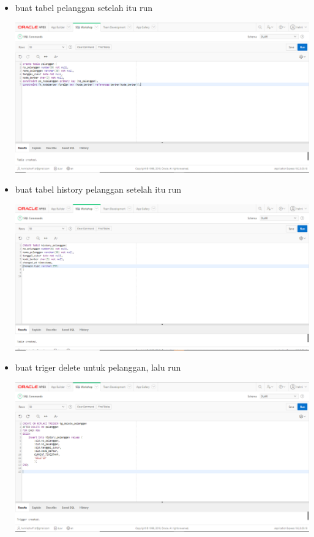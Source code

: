 ﻿\documentclass{article}
\begin{document}
\begin{itemize}
        \item buat tabel pelanggan setelah itu run 
        \begin{center}
        \centering
        \includegraphics[scale=0.3]{gambar/4.PNG}
    \end{center}
        
        \item buat tabel history pelanggan setelah itu run 
        \begin{center}
        \centering
        \includegraphics[scale=0.3]{gambar/6.PNG}
    \end{center}
    
        \item buat triger delete untuk pelanggan, lalu run
        \begin{center}
            \centering
            \includegraphics[scale=0.3]{gambar/7.PNG}
        \end{center}
        

\end{itemize}
\end{document}
